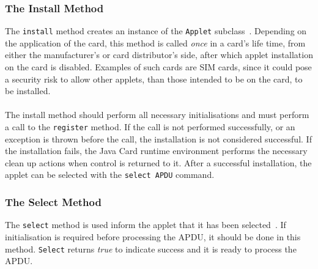 \subsubsection{The Install Method}\label{subsec:jcinstall}
The \texttt{install} method creates an instance of the \texttt{Applet} subclass~\cite[api p. 65]{java_card_spec}. Depending on the application of the card, this method is called \textit{once} in a card's life time, from either the manufacturer's or card distributor's side, after which applet installation on the card is disabled. Examples of such cards are SIM cards, since it could pose a security risk to allow other applets, than those intended to be on the card, to be installed.\\\\
The install method should perform all necessary initialisations and must perform a call to the \texttt{register} method. If the call is not performed successfully, or an exception is thrown before the call, the installation is not considered successful. If the installation fails, the Java Card runtime environment performs the necessary clean up actions when control is returned to it. After a successful installation, the applet can be selected with the \texttt{select APDU} command.


\subsubsection{The Select Method}\label{subsec:jcselect}
The \texttt{select} method is used inform the applet that it has been selected~\cite[api p. 68]{java_card_spec}. If initialisation is required before processing the APDU, it should be done in this method. \texttt{Select} returns \textit{true} to indicate success and it is ready to process the APDU.